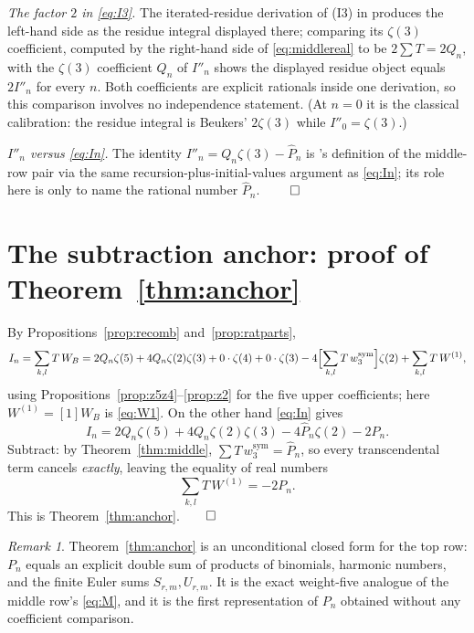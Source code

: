 \documentclass[11pt]{article}
\theoremstyle{remark}
\newtheorem{remark}{Remark}
\begin{document}
\emph{The factor $2$ in \eqref{eq:I3}.}  The iterated-residue derivation of
(I3) in \cite{BZ} produces the left-hand side as the residue integral
displayed there; comparing its $\zeta(3)$ coefficient, computed by the
right-hand side of \eqref{eq:middlereal} to be $2\sum T=2Q_n$, with the
$\zeta(3)$ coefficient $Q_n$ of $I''_n$ shows the displayed residue object
equals $2I''_n$ for every $n$.  Both coefficients are explicit rationals
inside one derivation, so this comparison involves no independence
statement.  (At $n=0$ it is the classical calibration: the residue integral
is Beukers' $2\zeta(3)$ while $I''_0=\zeta(3)$.)

\emph{$I''_n$ versus \eqref{eq:In}.}  The identity
$I''_n=Q_n\zeta(3)-\hat P_n$ is \cite{BZ}'s definition of the middle-row
pair via the same recursion-plus-initial-values argument as \eqref{eq:In};
its role here is only to name the rational number $\hat P_n$.
\hfill$\qed$

\section{The subtraction anchor: proof of Theorem~\ref{thm:anchor}}
\label{sec:anchor}

By Propositions~\ref{prop:recomb} and~\ref{prop:ratparts},
\begin{equation}\label{eq:barnesside}
 I_n=\sum_{k,l}T\,W_B
 =2Q_n\zeta(5)+4Q_n\zeta(2)\zeta(3)+0\cdot\zeta(4)+0\cdot\zeta(3)
 -4\Bigl[\sum_{k,l}T\,w_3^{\mathrm{sym}}\Bigr]\zeta(2)
 +\sum_{k,l}T\,W^{(1)},
\end{equation}
using Propositions~\ref{prop:z5z4}--\ref{prop:z2} for the five upper
coefficients; here $W^{(1)}=[1]W_B$ is \eqref{eq:W1}.  On the other hand
\eqref{eq:In} gives
\[
 I_n=2Q_n\zeta(5)+4Q_n\zeta(2)\zeta(3)-4\hat P_n\zeta(2)-2P_n .
\]
Subtract: by Theorem~\ref{thm:middle},
$\sum T\,w_3^{\mathrm{sym}}=\hat P_n$, so every transcendental term cancels
\emph{exactly}, leaving the equality of real numbers
\[
 \sum_{k,l}T\,W^{(1)}=-2P_n .
\]
This is Theorem~\ref{thm:anchor}.\hfill$\qed$

\begin{remark}
Theorem~\ref{thm:anchor} is an unconditional closed form for the top row:
$P_n$ equals an explicit double sum of products of binomials, harmonic
numbers, and the finite Euler sums $S_{r,m},U_{r,m}$.  It is the exact
weight-five analogue of the middle row's \eqref{eq:M}, and it is the first
representation of $P_n$ obtained without any coefficient comparison.
\end{remark}
\end{document}
